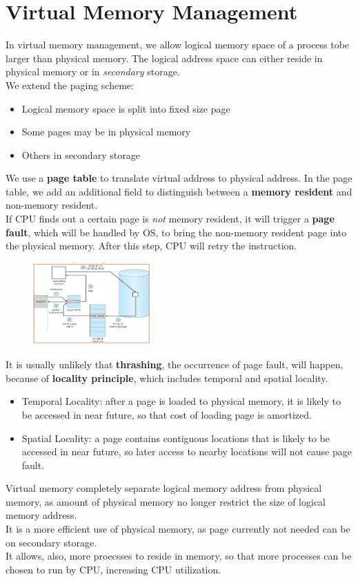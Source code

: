 \documentclass[12pt]{article}
\theoremstyle{definition}
\begin{document}
\section{Virtual Memory Management}
In virtual memory management, we allow logical memory space of a process tobe larger than physical memory. The logical address space can either reside in physical memory or in \textit{secondary} storage.\\
We extend the paging scheme:
\begin{itemize}
  \item Logical memory space is split into fixed size page
  \item Some pages may be in physical memory
  \item Others in secondary storage
\end{itemize}
We use a \textbf{page table} to translate virtual address to physical address. In the page table, we add an additional field to distinguish between a \textbf{memory resident} and non-memory resident.\\
If CPU finds out a certain page is \textit{not} memory resident, it will trigger a \textbf{page fault}, which will be handled by OS, to bring the non-memory resident page into the physical memory. After this step, CPU will retry the instruction. 
\begin{figure}[h]
\centering
\includegraphics[width=0.4\textwidth]{9_1.png}
\end{figure}
It is usually unlikely that \textbf{thrashing}, the occurrence of page fault, will happen, because of \textbf{locality principle}, which includes temporal and spatial locality.\\
\begin{itemize}
  \item Temporal Locality: after a page is loaded to physical memory, it is likely to be accessed in near future, so that cost of loading page is amortized.
  \item Spatial Locality: a page contains contiguous locations that is likely to be accessed in near future, so later access to nearby locations will not cause page fault.
\end{itemize}
Virtual memory completely separate logical memory address from physical memory, as amount of physical memory no longer restrict the size of logical memory address.\\
It is a more efficient use of physical memory, as page currently not needed can be on secondary storage.\\
It allows, also, more proecsses to reside in memory, so that more processes can be chosen to run by CPU, increasing CPU utilization.
\end{document}
